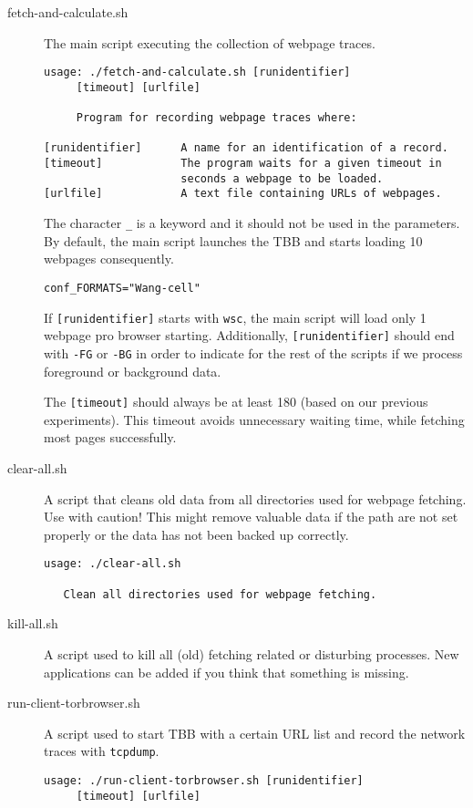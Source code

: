 \begin{description}
\item[fetch-and-calculate.sh] The main script executing the collection of webpage traces.
\begin{verbatim}
usage: ./fetch-and-calculate.sh [runidentifier] 
     [timeout] [urlfile]

     Program for recording webpage traces where:

[runidentifier]      A name for an identification of a record.
[timeout]            The program waits for a given timeout in 
                     seconds a webpage to be loaded.
[urlfile]            A text file containing URLs of webpages.
\end{verbatim}
The character \texttt{\_} is a keyword and it should not be used in the parameters. By default, the main script launches the \ac{TBB} and starts loading 10 webpages consequently.


\vspace{-4mm}
\begin{verbatim}
conf_FORMATS="Wang-cell"
\end{verbatim}

If \texttt{[runidentifier]} starts with \texttt{wsc}, the main script will load only 1 webpage pro browser starting. Additionally, \texttt{[runidentifier]} should end with \texttt{-FG} or \texttt{-BG} in order to indicate for the rest of the scripts if we process foreground or background data. 


The \texttt{[timeout]} should always be at least 180 (based on our previous experiments). This timeout avoids unnecessary waiting time, while fetching most pages successfully. 
\item[clear-all.sh] A script that cleans old data from all directories used for webpage fetching. Use with caution! This might remove valuable data if the path are not set properly or the data has not been backed up correctly.
\begin{verbatim}
usage: ./clear-all.sh

   Clean all directories used for webpage fetching.
\end{verbatim}
\item[kill-all.sh] A script used to kill all (old) fetching related or disturbing processes. New applications can be added if you think that something is missing.
\item[run-client-torbrowser.sh] A script used to start \ac{TBB} with a certain \ac{URL} list and record the network traces with \texttt{tcpdump}.
\begin{verbatim}
usage: ./run-client-torbrowser.sh [runidentifier]
     [timeout] [urlfile]


\end{verbatim}
\end{description}
